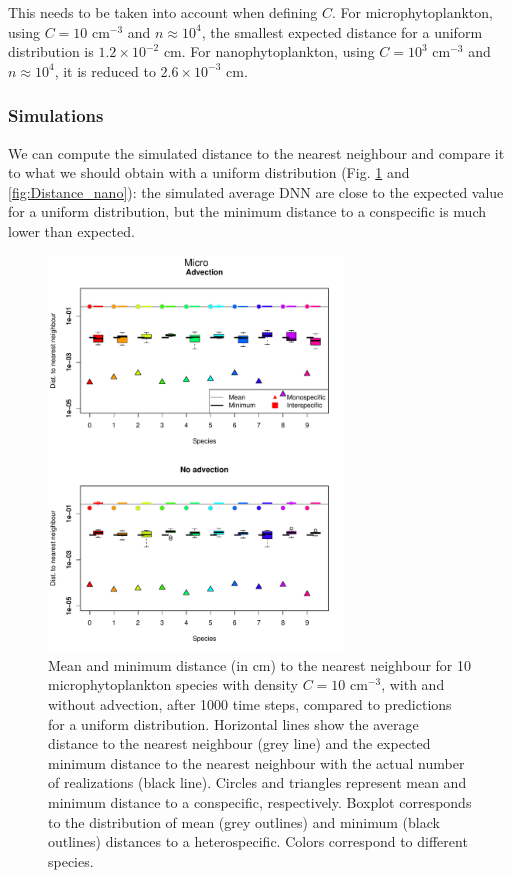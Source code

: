 \documentclass[english]{article}
\begin{document}
This needs to be taken into account when defining $C$. For microphytoplankton,
using $C=10$ cm$^{-3}$ and $n\approx10^{4}$, the smallest expected
distance for a uniform distribution is $1.2\times10^{-2}$ cm. For
nanophytoplankton, using $C=10^{3}$ cm$^{-3}$ and $n\approx10^{4}$,
it is reduced to $2.6\times10^{-3}$ cm. \medskip{}


\subsubsection*{Simulations}

We can compute the simulated distance to the nearest neighbour and
compare it to what we should obtain with a uniform distribution (Fig.
\ref{fig:Distance_micro} and \ref{fig:Distance_nano}): the simulated
average DNN are close to the expected value for a uniform distribution,
but the minimum distance to a conspecific is much lower than expected.

\begin{figure}[H]
\begin{centering}
\includegraphics[width=0.7\textwidth]{../code/figure/distrib_distance_micro_box_10sp}
\par\end{centering}
\caption{Mean and minimum distance (in cm) to the nearest neighbour for 10
microphytoplankton species with density $C=10$ cm$^{-3}$, with and
without advection, after 1000 time steps, compared to predictions
for a uniform distribution. Horizontal lines show the average distance
to the nearest neighbour (grey line) and the expected minimum distance
to the nearest neighbour with the actual number of realizations (black
line). Circles and triangles represent mean and minimum distance to
a conspecific, respectively. Boxplot corresponds to the distribution
of mean (grey outlines) and minimum (black outlines) distances to
a heterospecific. Colors correspond to different species. \label{fig:Distance_micro}}
\end{figure}
\end{document}
